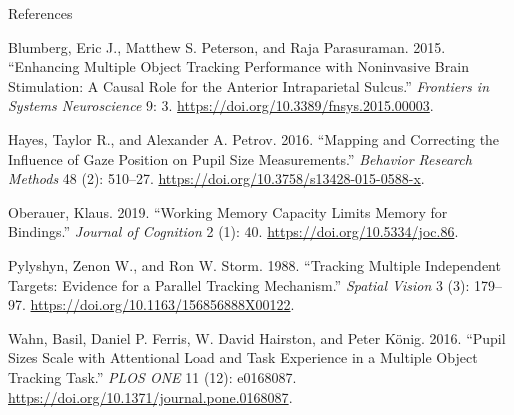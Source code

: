 \documentclass[12pt,ignorenonframetext,aspectratio=169]{beamer}
\begin{document}
\begin{frame}{References}
\protect\hypertarget{references}{}

\hypertarget{refs}{}
\leavevmode\hypertarget{ref-Blumberg2015}{}%
Blumberg, Eric J., Matthew S. Peterson, and Raja Parasuraman. 2015. ``Enhancing Multiple Object Tracking Performance with Noninvasive Brain Stimulation: A Causal Role for the Anterior Intraparietal Sulcus.'' \emph{Frontiers in Systems Neuroscience} 9: 3. \url{https://doi.org/10.3389/fnsys.2015.00003}.

\leavevmode\hypertarget{ref-hayesMappingCorrectingInfluence2016}{}%
Hayes, Taylor R., and Alexander A. Petrov. 2016. ``Mapping and Correcting the Influence of Gaze Position on Pupil Size Measurements.'' \emph{Behavior Research Methods} 48 (2): 510--27. \url{https://doi.org/10.3758/s13428-015-0588-x}.

\leavevmode\hypertarget{ref-oberauerWorkingMemoryCapacity2019}{}%
Oberauer, Klaus. 2019. ``Working Memory Capacity Limits Memory for Bindings.'' \emph{Journal of Cognition} 2 (1): 40. \url{https://doi.org/10.5334/joc.86}.

\leavevmode\hypertarget{ref-pylyshynTrackingMultipleIndependent1988}{}%
Pylyshyn, Zenon W., and Ron W. Storm. 1988. ``Tracking Multiple Independent Targets: Evidence for a Parallel Tracking Mechanism.'' \emph{Spatial Vision} 3 (3): 179--97. \url{https://doi.org/10.1163/156856888X00122}.

\leavevmode\hypertarget{ref-wahnPupilSizesScale2016}{}%
Wahn, Basil, Daniel P. Ferris, W. David Hairston, and Peter König. 2016. ``Pupil Sizes Scale with Attentional Load and Task Experience in a Multiple Object Tracking Task.'' \emph{PLOS ONE} 11 (12): e0168087. \url{https://doi.org/10.1371/journal.pone.0168087}.

\end{frame}
\end{document}
